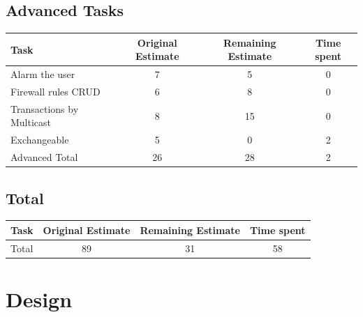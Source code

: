 \documentclass[11pt, a4paper]{article}
\begin{document}
\subsection{Advanced Tasks}
\begin{tabular} {| l | c | c | c |}\hline
Task &	Original Estimate & Remaining Estimate & Time spent \\ \hline
Alarm the user &	7	& 5	& 0 \\ \hline
Firewall rules CRUD &	6 &	8 & 	0 \\ \hline
Transactions by Multicast &	8 &	15 &	0 \\ \hline
Exchangeable & 5 & 0	 & 2 \\ \hline
Advanced Total & 26 &	28 &	2 \\ \hline
\end{tabular}

\subsection{Total}
\begin{tabular} {| l | c | c | c |}\hline
	Task &	Original Estimate & Remaining Estimate & Time spent \\ \hline
	Total & 89 & 31 & 58 \\ \hline
\end{tabular}

\section{Design}
\end{document}
